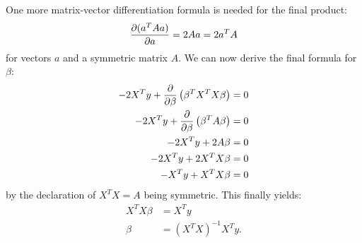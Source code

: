     One more matrix-vector differentiation formula is needed for the final product:
    \begin{align}
        \pdv{(a^TAa)}{a} = 2Aa = 2a^TA
    \end{align}
    for vectors $a$ and a symmetric matrix $A$. We can now derive the final formula for $\beta$:
    \begin{align}
        -2 X^Ty + \pdv{}{\beta} \left( \beta^TX^TX\beta \right) &= 0 \\
        -2 X^Ty + \pdv{}{\beta} \left( \beta^TA\beta \right) &= 0 \\
        -2 X^Ty + 2A\beta &= 0 \\
        -2 X^Ty + 2X^TX\beta &= 0 \\
        -X^Ty + X^TX\beta &= 0
    \end{align}
    by the declaration of $X^TX=A$ being symmetric. This finally yields:
    \begin{align}
        X^TX\beta &= X^Ty \\
        \beta &= \left( X^TX \right)^{-1}X^Ty.
    \end{align}
    \\
    